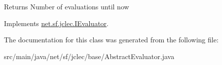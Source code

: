 \begin{DoxyReturn}{Returns}
Number of evaluations until now
\end{DoxyReturn}
 

Implements \hyperlink{interfacenet_1_1sf_1_1jclec_1_1_i_evaluator_a16f44ac81b7f59147da746461ab66f1c}{net.\-sf.\-jclec.\-I\-Evaluator}.



The documentation for this class was generated from the following file\-:\begin{DoxyCompactItemize}
\item 
src/main/java/net/sf/jclec/base/Abstract\-Evaluator.\-java\end{DoxyCompactItemize}
